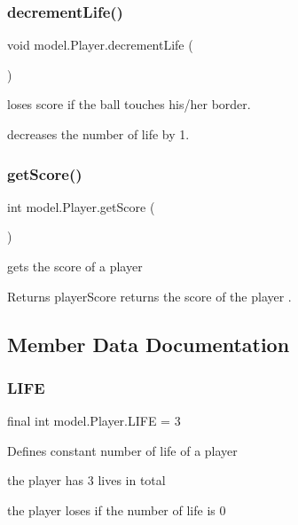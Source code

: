 \subsubsection{\texorpdfstring{decrement\+Life()}{decrementLife()}}
{\footnotesize\ttfamily void model.\+Player.\+decrement\+Life (\begin{DoxyParamCaption}{ }\end{DoxyParamCaption})}



loses score if the ball touches his/her border. 

decreases the number of life by 1. \hypertarget{classmodel_1_1_player_a9e027a7ee08d451cde3e6743e2ef1d6d}{}\label{classmodel_1_1_player_a9e027a7ee08d451cde3e6743e2ef1d6d} 
\subsubsection{\texorpdfstring{get\+Score()}{getScore()}}
{\footnotesize\ttfamily int model.\+Player.\+get\+Score (\begin{DoxyParamCaption}{ }\end{DoxyParamCaption})}



gets the score of a player 

\begin{DoxyReturn}{Returns}
player\+Score returns the score of the player . 
\end{DoxyReturn}


\subsection{Member Data Documentation}
\hypertarget{classmodel_1_1_player_a59153913ee338710aa1a33b68e5d0dbd}{}\label{classmodel_1_1_player_a59153913ee338710aa1a33b68e5d0dbd} 
\subsubsection{\texorpdfstring{L\+I\+FE}{LIFE}}
{\footnotesize\ttfamily final int model.\+Player.\+L\+I\+FE = 3\hspace{0.3cm}{\ttfamily [private]}}

Defines constant number of life of a player
\begin{DoxyItemize}
\item the player has 3 lives in total
\item the player loses if the number of life is 0 
\end{DoxyItemize}\hypertarget{classmodel_1_1_player_ad422bd3896f6c86c74fe49be0cae6759}{}\label{classmodel_1_1_player_ad422bd3896f6c86c74fe49be0cae6759} 
